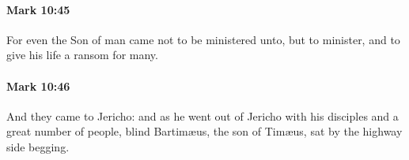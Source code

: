 		\paragraph{Mark 10:45} %
			\label{MARK-10-45}

			For even the Son of man came not to be ministered unto, but to minister, and to give his life a ransom for many.

			\begin{framed}
			\scriptsize
				\begin{compactdesc}
					\item[SBLG] 
				\end{compactdesc}
			\end{framed}

		\paragraph{Mark 10:46} %
			\label{MARK-10-46}

			And they came to Jericho: and as he went out of Jericho with his disciples and a great number of people, blind Bartimæus, the son of Timæus, sat by the highway side begging.

